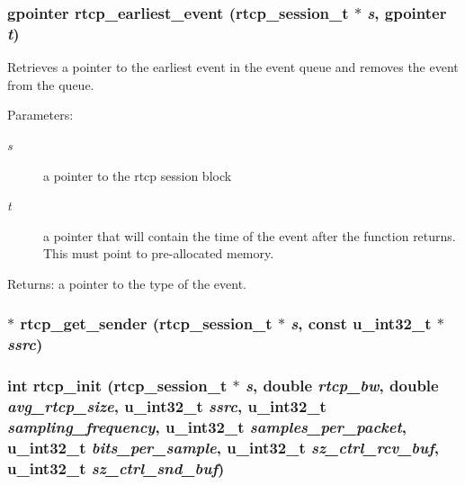 \subsubsection{\setlength{\rightskip}{0pt plus 5cm}gpointer rtcp\_\-earliest\_\-event ({\bf rtcp\_\-session\_\-t} $\ast$ {\em s}, gpointer {\em t})}\label{rtcp_8h_a18}


Retrieves a pointer to the earliest event in the event queue and removes the event from the queue. \begin{Desc}
\item[Parameters:]
\begin{description}
\item[{\em s}]a pointer to the rtcp session block \item[{\em t}]a pointer that will contain the time of the event after the function returns. This must point to pre-allocated memory. \end{description}
\end{Desc}
\begin{Desc}
\item[Returns:]a pointer to the type of the event. \end{Desc}
\subsubsection{$\ast$ rtcp\_\-get\_\-sender ({\bf rtcp\_\-session\_\-t} $\ast$ {\em s}, const u\_\-int32\_\-t $\ast$ {\em ssrc})\hspace{0.3cm}{\tt  [static]}}\label{rtcp_8h_a10}


\subsubsection{\setlength{\rightskip}{0pt plus 5cm}int rtcp\_\-init ({\bf rtcp\_\-session\_\-t} $\ast$ {\em s}, double {\em rtcp\_\-bw}, double {\em avg\_\-rtcp\_\-size}, u\_\-int32\_\-t {\em ssrc}, u\_\-int32\_\-t {\em sampling\_\-frequency}, u\_\-int32\_\-t {\em samples\_\-per\_\-packet}, u\_\-int32\_\-t {\em bits\_\-per\_\-sample}, u\_\-int32\_\-t {\em sz\_\-ctrl\_\-rcv\_\-buf}, u\_\-int32\_\-t {\em sz\_\-ctrl\_\-snd\_\-buf})}\label{rtcp_8h_a0}



